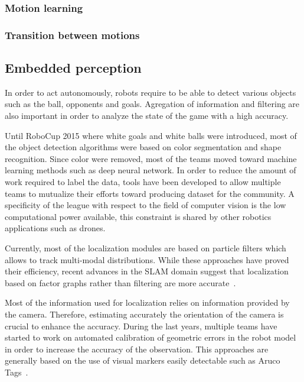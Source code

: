 \documentclass{article}
\begin{document}
\subsubsection{Motion learning}

\subsubsection{Transition between motions}

\subsection{Embedded perception}

In order to act autonomously, robots require to be able to detect various
objects such as the ball, opponents and goals. Agregation of information and
filtering are also important in order to analyze the state of the game with a
high accuracy.

Until RoboCup 2015 where white goals and white balls were introduced, most of
the object detection algorithms were based on color segmentation and shape
recognition. Since color were removed, most of the teams moved toward machine
learning methods such as deep neural network. In order to reduce the amount of
work required to label the data, tools have been developed to allow multiple
teams to mutualize their efforts toward producing dataset for the community. A
specificity of the league with respect to the field of computer vision is the
low computational power available, this constraint is shared by other robotics
applications such as drones.

Currently, most of the localization modules are based on particle filters which
allows to track multi-modal distributions. While these approaches have proved
their efficiency, recent advances in the SLAM domain suggest that localization
based on factor graphs rather than filtering are more
accurate~\cite{Strasdat2012}.

Most of the information used for localization relies on information provided by
the camera. Therefore, estimating accurately the orientation of the camera is
crucial to enhance the accuracy. During the last years, multiple teams have
started to work on automated calibration of geometric errors in the robot model
in order to increase the accuracy of the observation. This approaches are
generally based on the use of visual markers easily detectable such as Aruco
Tags~\cite{Garrido-Jurado2014}.
\end{document}
